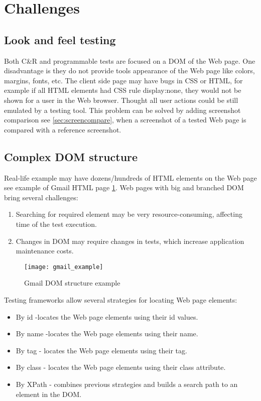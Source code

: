  
\section {Challenges}
	\label {sec:challenges}
	\subsection{Look and feel testing}
	    Both C\&R and programmable tests are focused on a DOM of the Web page.
	    One disadvantage is they do not provide tools appearance of the Web page
	    like colors, margins, fonts, etc. The client side page may have bugs in CSS
	    or HTML, for example if all HTML elements had CSS rule display:none, they
	    would not be shown for a user in the Web browser. Thought all user actions
	    could be still emulated by a testing tool. This problem can be solved by adding screenshot
      comparison see \ref{sec:screencompare}, when a screenshot of a tested Web
      page is compared with a reference screenshot. 
	\subsection{Complex DOM structure}
    Real-life example may have dozens/hundreds of HTML
		elements on the Web page see example of Gmail HTML page
		\ref{fig:gmailexample}.
		Web pages with big and branched DOM bring several challenges:
		\begin{enumerate}
		  \item Searching for required element may be very resource-consuming,
		  affecting time of the test execution. 
		  \item Changes in DOM may require changes in tests, which increase
		  application maintenance costs.
		\end{enumerate}
		
		\begin{figure}
		\label{fig:gmailexample}
		\texttt{[image: gmail\_example]}
		\caption{Gmail DOM structure example}
		\end{figure}
		
		Testing frameworks allow several strategies for locating Web page elements:
		\begin{itemize}
		  \item By id -locates the Web page elements using their id values.
		  \item By name -locates the Web page elements using their name.
		  \item By tag - locates the Web page elements using their tag.
		  \item By class - locates the Web page elements using their class attribute.
		  \item By XPath - combines previous strategies and builds a search
		  path to an element in the DOM.
		\end{itemize}
		
